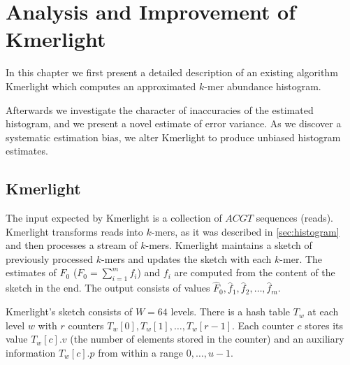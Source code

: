 \chapter{Analysis and Improvement of Kmerlight}
\label{sec:chapter2}
In this chapter we first present a detailed description of an existing algorithm
Kmerlight \cite{Sivadasan2016} which computes an approximated $k$-mer abundance histogram.

Afterwards we investigate the character of inaccuracies of the estimated histogram, and we present
a novel estimate of error variance. As we discover a systematic estimation bias, we alter
Kmerlight to produce unbiased histogram estimates. 

\section{Kmerlight}
\label{sec:kmerlight}
The input expected by Kmerlight is a collection of $ACGT$ sequences (reads).
Kmerlight transforms reads into $k$-mers, as it was described in \ref{sec:histogram}
and then processes a stream of $k$-mers. Kmerlight maintains a sketch of previously
processed $k$-mers and updates the sketch with each $k$-mer. The estimates 
of $F_0$ ($F_0 = \sum_{i=1}^{m} f_i$) and $f_i$ are computed from the content of
the sketch in the end. The output consists of values $\hat F_0, \hat f_1, 
\hat f_2, \dots, \hat f_m$.

Kmerlight's sketch consists of $W=64$ levels. There is a hash table $T_w$ at each level 
$w$ with $r$ counters $T_w[0], T_w[1], \dots, T_w[r-1]$.
Each counter $c$ stores its value $T_w[c].v$ (the number of elements stored in the counter)
and an auxiliary information $T_w[c].p$ from within a range $0, \dots, u-1$.


